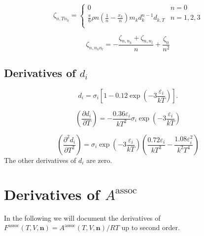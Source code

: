 \documentclass[english]{../thermomemo/thermomemo}
\newcommand{\mbf}[0]{\mathbf}
\newcommand*{\pder}[2]{\left(\frac{\partial #1}{\partial #2}\right)}
\newcommand*{\pdder}[2]{\left(\frac{\partial^2 #1}{\partial #2^2}\right)}
\newcommand{\z}{\zeta}
\newcommand{\lp}{\left(}
\newcommand{\rp}{\right)}
\begin{document}
\begin{equation}
  \z_{n,T n_k} = \begin{cases}
    0 & n = 0 \\ 
    \frac{\pi}{6} \rho n \lp \frac{1}{n} - \frac{x_k}{n} \rp m_k d_k^{n-1} d_{k,T} & n = 1,2,3 \\
  \end{cases}
\end{equation}

\begin{equation}
  \z_{n, n_k n_l} = - \frac{\z_{n,n_k}+\z_{n,n_l}}{n} + \frac{\z_n}{n^2}
\end{equation}

\subsection{Derivatives of $d_i$}
\begin{equation}
  d_i = \sigma_i \left[1 - 0.12\exp \lp -3\frac{\varepsilon_i}{kT} \rp \right].
\end{equation}

\begin{equation}
  \pder{d_i}{T} = -\frac{0.36\varepsilon_i}{kT^2} \sigma_i \exp \lp -3\frac{\varepsilon_i}{kT} \rp
\end{equation}

\begin{equation}
  \pdder{d_i}{T} = \sigma_i \exp \lp -3\frac{\varepsilon_i}{kT} \rp \lp \frac{0.72 \varepsilon_i}{kT^3} - \frac{1.08 \varepsilon_i^2}{k^2T^4}\rp
\end{equation}
The other derivatives of $d_i$ are zero.

\section{Derivatives of $A^{\textrm{assoc}}$}
In the following we will document the derivatives of $F^{\text{assoc}}(T,V,\mbf n)=A^{\textrm{assoc}}(T,V,\mbf n)/RT$ up to second order.
\end{document}
